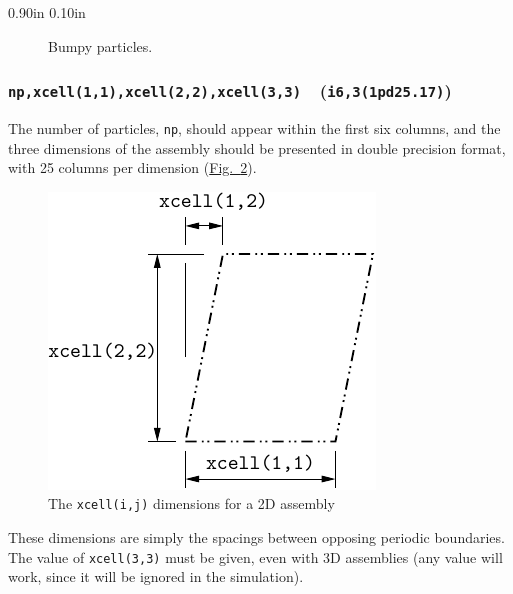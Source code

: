 \documentclass[letterpaper,11pt]{article}
\newcommand{\Var}[2]{\texttt{#1}\ \  (\texttt{#2})}
\newlength{\Labelwidth}
\newcommand{\Entrylabel}[1]{\makebox[\Labelwidth][r]{\texttt{#1}}}
\newenvironment{Options}
{\begin{list}{}{%
\renewcommand{\makelabel}{\Entrylabel}%
\setlength{\leftmargin} {0.90in}%
\setlength{\rightmargin}{0.00in}%
\setlength{\labelsep}   {0.10in}%
\setlength{\labelwidth} {\Labelwidth}%
}}
{\end{list}}
\begin{document}
\begin{Options}
\begin{figure}
%
\caption{Bumpy particles.}
\label{fig:bumpies}
\end{figure}
\end{Options}
%
\subsubsection[\texttt{np, xcell(1,1)}]{\Var{np,xcell(1,1),xcell(2,2),xcell(3,3)}{i6,3(1pd25.17)}}%
\label{sec:xcell11}
The number of particles, \texttt{np}, 
should appear within the first six columns,
and the three dimensions of the assembly should be presented
in double precision format, with 25 columns per 
dimension (\hyperref[fig:xcells]{Fig.~\ref*{fig:xcells}}).
\begin{figure}
  \centering
  \includegraphics{Figures/xcells.pdf}
  \caption{The \texttt{xcell(i,j)} dimensions for a 2D assembly}
  \label{fig:xcells}
\end{figure}
These dimensions are simply the spacings between opposing periodic
boundaries.
The value of \texttt{xcell(3,3)} must be given, even with
3D assemblies (any value will work, since it will be ignored in the
simulation).
%
\end{document}
